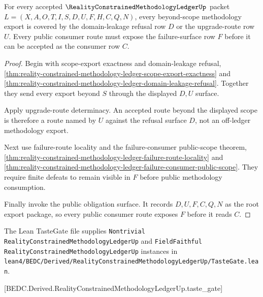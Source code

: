\begin{theorem}
\label{thm:reality-constrained-methodology-ledger-root-export-coverage}
For every accepted $\RealityConstrainedMethodologyLedgerUp$ packet
$L=(X,A,O,T,I,S,D,U,F,H,C,Q,N)$, every beyond-scope methodology export is covered
by the domain-leakage refusal row $D$ or the upgrade-route row $U$. Every public
consumer route must expose the failure-surface row $F$ before it can be accepted
as the consumer row $C$.
\end{theorem}
\begin{proof}
Begin with scope-export exactness and domain-leakage refusal,
\autoref{thm:reality-constrained-methodology-ledger-scope-export-exactness} and
\autoref{thm:reality-constrained-methodology-ledger-domain-leakage-refusal}.
Together they send every export beyond $S$ through the displayed $D,U$ surface.

Apply upgrade-route determinacy. An accepted route beyond the displayed scope is
therefore a route named by $U$ against the refusal surface $D$, not an
off-ledger methodology export.

Next use failure-route locality and the failure-consumer public-scope theorem,
\autoref{thm:reality-constrained-methodology-ledger-failure-route-locality} and
\autoref{thm:reality-constrained-methodology-ledger-failure-consumer-public-scope}.
They require finite defeats to remain visible in $F$ before public methodology
consumption.

Finally invoke the public obligation surface. It records $D,U,F,C,Q,N$ as the
root export package, so every public consumer route exposes $F$ before it reads
$C$.
\end{proof}



The Lean TasteGate file supplies \texttt{Nontrivial RealityConstrainedMethodologyLedgerUp} and \texttt{FieldFaithful RealityConstrainedMethodologyLedgerUp} instances in \texttt{lean4/BEDC/Derived/RealityConstrainedMethodologyLedgerUp/TasteGate.lean}.

[BEDC.Derived.RealityConstrainedMethodologyLedgerUp.taste\_gate]

